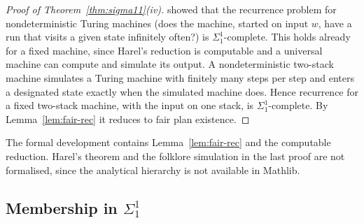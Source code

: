 \begin{proof}[Proof of Theorem~\ref{thm:sigma11}(iv)]
  \textcite{harel:jacm-86} showed that the recurrence problem for nondeterministic Turing machines
  (does the machine, started on input $w$, have a run that visits a given state infinitely often?)
  is $\Sigma^1_1$-complete. This holds already for a fixed machine, since Harel's reduction is
  computable and a universal machine can compute and simulate its output. A nondeterministic
  two-stack machine simulates a Turing machine with finitely many steps per step and enters a
  designated state exactly when the simulated machine does. Hence recurrence for a fixed two-stack
  machine, with the input on one stack, is $\Sigma^1_1$-complete. By Lemma~\ref{lem:fair-rec} it
  reduces to fair plan existence.
\end{proof}

The formal development contains Lemma~\ref{lem:fair-rec} and the computable reduction. Harel's
theorem and the folklore simulation in the last proof are not formalised, since the
analytical hierarchy is not available in Mathlib.

\subsection{Membership in $\Sigma^1_1$}

